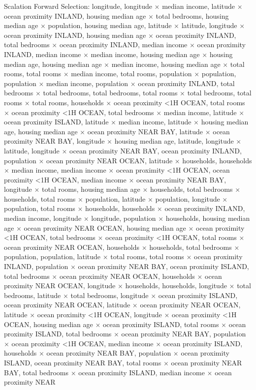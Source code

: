 \documentclass{article}
\begin{document}
Scalation Forward Selection: longitude, longitude $\times$ median income, latitude $\times$ ocean proximity INLAND, housing median age $\times$ total bedrooms, housing median age $\times$ population, housing median age, latitude $\times$ latitude, longitude $\times$ ocean proximity INLAND, housing median age $\times$ ocean proximity INLAND, total bedrooms $\times$ ocean proximity INLAND, median income $\times$ ocean proximity INLAND, median income $\times$ median income, housing median age $\times$ housing median age, housing median age $\times$ median income, housing median age $\times$ total rooms, total rooms $\times$ median income, total rooms, population $\times$ population, population $\times$ median income, population $\times$ ocean proximity INLAND, total bedrooms $\times$ total bedrooms, total bedrooms, total rooms $\times$ total bedrooms, total rooms $\times$ total rooms, households $\times$ ocean proximity <1H OCEAN, total rooms $\times$ ocean proximity <1H OCEAN, total bedrooms $\times$ median income, latitude $\times$ ocean proximity ISLAND, latitude $\times$ median income, latitude $\times$ housing median age, housing median age $\times$ ocean proximity NEAR BAY, latitude $\times$ ocean proximity NEAR BAY, longitude $\times$ housing median age, latitude, longitude $\times$ latitude, longitude $\times$ ocean proximity NEAR BAY, ocean proximity INLAND, population $\times$ ocean proximity NEAR OCEAN, latitude $\times$ households, households $\times$ median income, median income $\times$ ocean proximity <1H OCEAN, ocean proximity <1H OCEAN, median income $\times$ ocean proximity NEAR BAY, longitude $\times$ total rooms, housing median age $\times$ households, total bedrooms $\times$ households, total rooms $\times$ population, latitude $\times$ population, longitude $\times$ population, total rooms $\times$ households, households $\times$ ocean proximity INLAND, median income, longitude $\times$ longitude, population $\times$ households, housing median age $\times$ ocean proximity NEAR OCEAN, housing median age $\times$ ocean proximity <1H OCEAN, total bedrooms $\times$ ocean proximity <1H OCEAN, total rooms $\times$ ocean proximity NEAR OCEAN, households $\times$ households, total bedrooms $\times$ population, population, latitude $\times$ total rooms, total rooms $\times$ ocean proximity INLAND, population $\times$ ocean proximity NEAR BAY, ocean proximity ISLAND, total bedrooms $\times$ ocean proximity NEAR OCEAN, households $\times$ ocean proximity NEAR OCEAN, longitude $\times$ households, households, longitude $\times$ total bedrooms, latitude $\times$ total bedrooms, longitude $\times$ ocean proximity ISLAND, ocean proximity NEAR OCEAN, latitude $\times$ ocean proximity NEAR OCEAN, latitude $\times$ ocean proximity <1H OCEAN, longitude $\times$ ocean proximity <1H OCEAN, housing median age $\times$ ocean proximity ISLAND, total rooms $\times$ ocean proximity ISLAND, total bedrooms $\times$ ocean proximity NEAR BAY, population $\times$ ocean proximity <1H OCEAN, median income $\times$ ocean proximity ISLAND, households $\times$ ocean proximity NEAR BAY, population $\times$ ocean proximity ISLAND, ocean proximity NEAR BAY, total rooms $\times$ ocean proximity NEAR BAY, total bedrooms $\times$ ocean proximity ISLAND, median income $\times$ ocean proximity NEAR 
\end{document}
